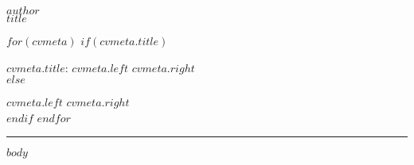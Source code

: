 \documentclass[10pt,A4]{article}
\newcommand{\metasection}[2]
{
\footnotesize{#2} \hspace*{\fill} \footnotesize{#1}\\[1pt]
}
\newcommand{\metameta}[2]
{
\footnotesize{#1} \hspace*{\fill} \footnotesize{#2}\\[12pt]
}
\begin{document}
\pagestyle{fancy}

\vspace{-8pt}
\begin{center}
	\HUGE \textsc{$author$} \\[2pt]
	\huge $title$
\end{center}

\vspace{6pt}

$for(cvmeta)$
$if(cvmeta.title)$
\metasection{$cvmeta.right$}{\textbf{$cvmeta.title$}: $cvmeta.left$}
$else$
\metameta{$cvmeta.left$}{$cvmeta.right$}
$endif$
$endfor$


\vspace{-2pt}
\textcolor{softcol}{\hrule}
\vspace{6pt}

\normalsize

\vspace{-6pt}
$body$
\end{document}
